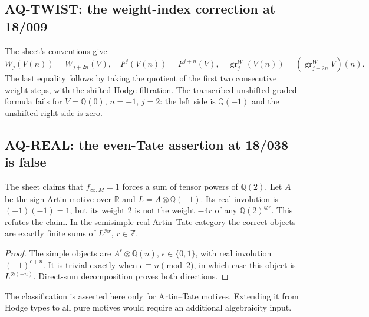\subsection{AQ-TWIST: the weight-index correction at 18/009}
The sheet's conventions give
\[
 W_j(V(n))=W_{j+2n}(V),\quad F^j(V(n))=F^{j+n}(V),\quad
 \operatorname{gr}^W_j(V(n))
 =(\operatorname{gr}^W_{j+2n}V)(n).                             \tag{AQ.6}
\]
The last equality follows by taking the quotient of the
first two consecutive weight steps, with the shifted Hodge
filtration. The transcribed unshifted graded formula fails
for $V=\mathbb Q(0)$, $n=-1$, $j=2$: the left side is
$\mathbb Q(-1)$ and the unshifted right side is zero.

\subsection{AQ-REAL: the even-Tate assertion at 18/038 is false}
The sheet claims that $f_{\infty,M}=1$ forces a sum of
tensor powers of $\mathbb Q(2)$.
Let $A$ be the sign Artin motive over $\mathbb R$ and
$L=A\otimes\mathbb Q(-1)$. Its real involution is
$(-1)(-1)=1$, but its weight $2$ is not the weight $-4r$
of any $\mathbb Q(2)^{\otimes r}$. This refutes the claim.
In the semisimple real Artin--Tate category the correct
objects are exactly finite sums of $L^{\otimes r}$,
$r\in\mathbb Z$.
\begin{proof}
The simple objects are $A^\epsilon\otimes\mathbb Q(n)$,
$\epsilon\in\{0,1\}$, with real involution
$(-1)^{\epsilon+n}$. It is trivial exactly when
$\epsilon\equiv n\pmod2$, in which case this object is
$L^{\otimes(-n)}$. Direct-sum decomposition proves both
directions.
\end{proof}
The classification is asserted here only for Artin--Tate
motives. Extending it from Hodge types to all pure motives
would require an additional algebraicity input.

